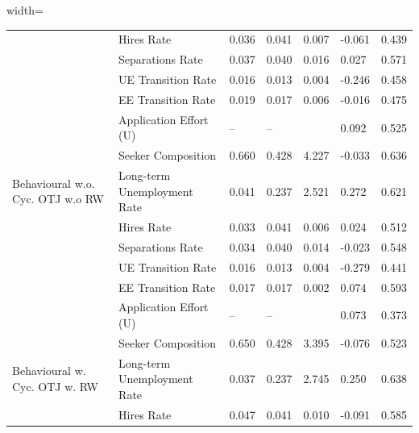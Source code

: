 \begin{adjustbox}{width=\textwidth}
\begin{tabular}{lllllll}
\cellcolor{modelBehaviouralwCycOTJwoRW!25} & Hires Rate & 0.036 & 0.041 & 0.007 & \cellcolor{green!40!yellow!25}-0.061 & 0.439 \\
\cellcolor{modelBehaviouralwCycOTJwoRW!25} & Separations Rate & 0.037 & 0.040 & 0.016 & \cellcolor{green!70!yellow!25}0.027 & 0.571 \\
\cellcolor{modelBehaviouralwCycOTJwoRW!25} & UE Transition Rate & 0.016 & 0.013 & 0.004 & \cellcolor{green!25}-0.246 & 0.458 \\
\cellcolor{modelBehaviouralwCycOTJwoRW!25} & EE Transition Rate & 0.019 & 0.017 & 0.006 & \cellcolor{red!25}-0.016 & 0.475 \\
\cellcolor{modelBehaviouralwCycOTJwoRW!25} & Application Effort (U) & -- & -- &  & \cellcolor{green!25}0.092 & 0.525 \\
\cellcolor{modelBehaviouralwCycOTJwoRW!25} & Seeker Composition & 0.660 & 0.428 & 4.227 & \cellcolor{green!25}-0.033 & 0.636 \\
\cellcolor{modelBehaviouralwoCycOTJwoRW!25}Behavioural w.o. Cyc. OTJ w.o RW & Long-term Unemployment Rate & 0.041 & 0.237 & 2.521 & \cellcolor{green!25}0.272 & 0.621 \\
\cellcolor{modelBehaviouralwoCycOTJwoRW!25} & Hires Rate & 0.033 & 0.041 & 0.006 & \cellcolor{green!25}0.024 & 0.512 \\
\cellcolor{modelBehaviouralwoCycOTJwoRW!25} & Separations Rate & 0.034 & 0.040 & 0.014 & \cellcolor{red!25}-0.023 & 0.548 \\
\cellcolor{modelBehaviouralwoCycOTJwoRW!25} & UE Transition Rate & 0.016 & 0.013 & 0.004 & \cellcolor{yellow!25}-0.279 & 0.441 \\
\cellcolor{modelBehaviouralwoCycOTJwoRW!25} & EE Transition Rate & 0.017 & 0.017 & 0.002 & \cellcolor{green!40!yellow!25}0.074 & 0.593 \\
\cellcolor{modelBehaviouralwoCycOTJwoRW!25} & Application Effort (U) & -- & -- &  & \cellcolor{green!70!yellow!25}0.073 & 0.373 \\
\cellcolor{modelBehaviouralwoCycOTJwoRW!25} & Seeker Composition & 0.650 & 0.428 & 3.395 & \cellcolor{yellow!25}-0.076 & 0.523 \\
\cellcolor{modelBehaviouralwCycOTJwRW!25}Behavioural w. Cyc. OTJ w. RW & Long-term Unemployment Rate & 0.037 & 0.237 & 2.745 & \cellcolor{green!40!yellow!25}0.250 & 0.638 \\
\cellcolor{modelBehaviouralwCycOTJwRW!25} & Hires Rate & 0.047 & 0.041 & 0.010 & \cellcolor{orange!25}-0.091 & 0.585 \\

\end{tabular}
\end{adjustbox}
